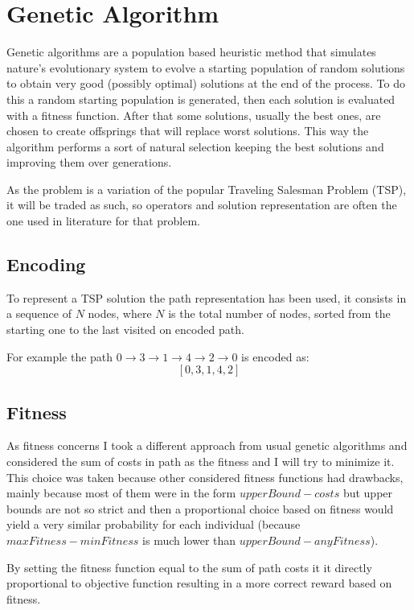 \section{Genetic Algorithm}
	Genetic algorithms are a population based heuristic method that simulates nature's evolutionary system to evolve a starting population of random solutions to obtain very good (possibly optimal) solutions at the end of the process. To do this a random starting population is generated, then each solution is evaluated with a fitness function. After that some solutions, usually the best ones, are chosen to create offsprings that will replace worst solutions. This way the algorithm performs a sort of natural selection keeping the best solutions and improving them over generations.
	
	As the problem is a variation of the popular Traveling Salesman Problem (TSP), it will be traded as such, so operators and solution representation are often the one used in literature for that problem.
		
	\subsection{Encoding}
		To represent a TSP solution the path representation has been used, it consists in a sequence of $N$ nodes, where $N$ is the total number of nodes, sorted from the starting one to the last visited on encoded path.
		
		For example the path $0 \rightarrow 3 \rightarrow 1 \rightarrow 4 \rightarrow 2 \rightarrow 0$ is encoded as:
		\[[0, 3, 1, 4, 2]\]
	
	\subsection{Fitness}
		As fitness concerns I took a different approach from usual genetic algorithms and considered the sum of costs in path as the fitness and I will try to minimize it.
		This choice was taken because other considered fitness functions had drawbacks, mainly because most of them were in the form $upperBound - costs$ but upper bounds are not so strict and then a proportional choice based on fitness would yield a very similar probability for each individual (because $maxFitness - minFitness$ is much lower than $upperBound - anyFitness$).
		
		By setting the fitness function equal to the sum of path costs it it directly proportional to objective function resulting in a more correct reward based on fitness.
		
